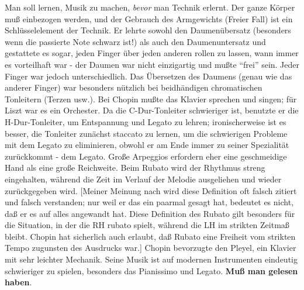 Man soll lernen, Musik zu machen, \textit{bevor} man Technik erlernt.
Der ganze Körper muß einbezogen werden, und der Gebrauch des Armgewichts (Freier Fall) ist ein Schlüsselelement der Technik.
Er lehrte sowohl den Daumenübersatz (besonders wenn die passierte Note schwarz ist!) als auch den Daumenuntersatz und gestattete es sogar, jeden Finger über jeden anderen rollen zu lassen, wann immer es vorteilhaft war - der Daumen war nicht einzigartig und mußte \enquote{frei} sein.
Jeder Finger war jedoch unterschiedlich.
Das Übersetzen des Daumens (genau wie das anderer Finger) war besonders nützlich bei beidhändigen chromatischen Tonleitern (Terzen usw.).
Bei Chopin mußte das Klavier sprechen und singen; für Liszt war es ein Orchester.
Da die C-Dur-Tonleiter schwieriger ist, benutzte er die H-Dur-Tonleiter, um Entspannung und Legato zu lehren; ironischerweise ist es besser, die Tonleiter zunächst staccato zu lernen, um die schwierigen Probleme mit dem Legato zu eliminieren, obwohl er am Ende immer zu seiner Spezialität zurückkommt - dem Legato.
Große Arpeggios erfordern eher eine geschmeidige Hand als eine große Reichweite.
Beim Rubato wird der Rhythmus streng eingehalten, während die Zeit im Verlauf der Melodie ausgeliehen und wieder zurückgegeben wird.
[Meiner Meinung nach wird diese Definition oft falsch zitiert und falsch verstanden; nur weil er das ein paarmal gesagt hat, bedeutet es nicht, daß er es auf alles angewandt hat.
Diese Definition des Rubato gilt besonders für die Situation, in der die RH rubato spielt, während die LH im strikten Zeitmaß bleibt.
Chopin hat sicherlich auch erlaubt, daß Rubato eine Freiheit vom strikten Tempo zugunsten des Ausdrucks war.]
Chopin bevorzugte den Pleyel, ein Klavier mit sehr leichter Mechanik.
Seine Musik ist auf modernen Instrumenten eindeutig schwieriger zu spielen, besonders das Pianissimo und Legato.
\textbf{Muß man gelesen haben}.


\hypertarget{Fink}{}

